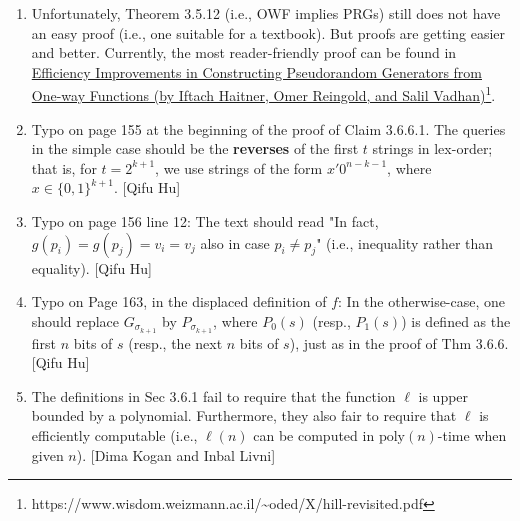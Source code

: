 \documentclass[10pt,a4paper]{article}
\newcommand{\poly}{\mathrm{poly}}
\begin{document}
\begin{enumerate}
	\item Unfortunately, Theorem 3.5.12 (i.e., OWF implies PRGs) still does not have an easy proof (i.e., one suitable for a textbook). But proofs are getting easier and better. Currently, the most reader-friendly proof can be found in \href{https://www.wisdom.weizmann.ac.il/~oded/X/hill-revisited.pdf}{Efficiency Improvements in Constructing Pseudorandom Generators from One-way Functions (by Iftach Haitner, Omer Reingold, and Salil Vadhan)}\footnote{https://www.wisdom.weizmann.ac.il/\textasciitilde oded/X/hill-revisited.pdf}.
	\item Typo on page 155 at the beginning of the proof of Claim 3.6.6.1. The queries in the simple case should be the \textbf{reverses} of the first $t$ strings in lex-order; that is, for $t=2^{k+1}$, we use strings of the form $x'0^{n-k-1}$, where $x\in\{0,1\}^{k+1}$. [Qifu Hu]
	\item Typo on page 156 line 12: The text should read "In fact, $g(p_i)=g(p_j)=v_i=v_j$ also in case $p_i \neq p_j$" (i.e., inequality rather than equality). [Qifu Hu]
	\item Typo on Page 163, in the displaced definition of $f$: In the otherwise-case, one should replace $G_{\sigma_{k+1}}$ by $P_{\sigma_{k+1}}$, where $P_0(s)$ (resp., $P_1(s)$) is defined as the first $n$ bits of $s$ (resp., the next $n$ bits of $s$), just as in the proof of Thm 3.6.6. [Qifu Hu]
	\item The definitions in Sec 3.6.1 fail to require that the function $\ell$ is upper bounded by a polynomial. Furthermore, they also fair to require that $\ell$ is efficiently computable (i.e., $\ell(n)$ can be computed in $\poly(n)$-time when given $n$). [Dima Kogan and Inbal Livni] 
	

\end{enumerate}
\end{document}
